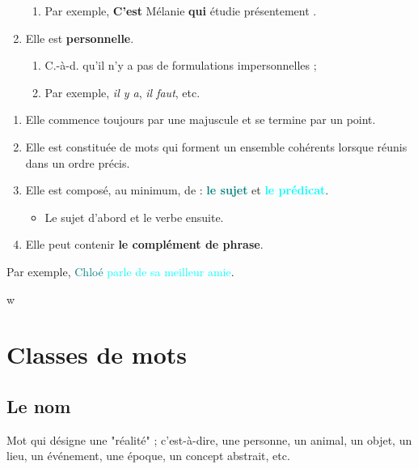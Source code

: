 \documentclass[10pt, french]{article}
\begin{document}
\begin{multicols*}{2}
\begin{definitionNOHFILLprop}
\begin{enumerate}
\begin{enumerate}
		\item	Par exemple, \og \textbf{C'est} Mélanie \textbf{qui} étudie présentement \fg{}.
		\end{enumerate}
	\item	Elle est \textbf{personnelle}.
		\begin{enumerate}
		\item	C.-à-d. qu'il n'y a pas de formulations impersonnelles ;
		\item	Par exemple, \textit{il y a}, \textit{il faut}, etc.
		\end{enumerate}
\end{enumerate}
\end{definitionNOHFILLprop}

\begin{definitionNOHFILLpropos}[Caractéristiques]
\begin{enumerate}
	\item	Elle commence toujours par une majuscule et se termine par un point.
	\item	Elle est constituée de mots qui forment un ensemble cohérents lorsque réunis dans un ordre précis.
	\item	Elle est composé, au minimum, de : \textbf{\textcolor{teal}{le sujet}} et \textbf{\textcolor{cyan}{le prédicat}}.
		\begin{itemize}
		\item	Le sujet d'abord et le verbe ensuite.
		\end{itemize}
	\item	Elle peut contenir \textbf{le complément de phrase}.
\end{enumerate}
\tcbline
Par exemple, \textcolor{teal}{Chloé} \textcolor{cyan}{parle de sa meilleur amie}.
\end{definitionNOHFILLpropos}




\newpage
w\section{Classes de mots}
\subsection{Le nom}
\begin{definitionNOHFILL}[Le nom]
Mot qui désigne une "réalité" ; c'est-à-dire, une personne, un animal, un objet, un lieu, un événement, une époque, un concept abstrait, etc.	\\


\end{definitionNOHFILL}
\end{multicols*}
\end{document}
